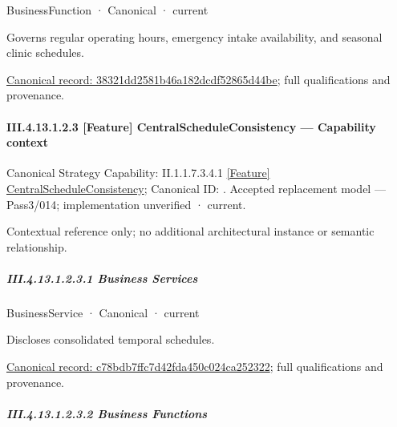 \label{element:38321dd2581b46a182dcdf52865d44be}
{\small BusinessFunction · Canonical · current}\par

Governs regular operating hours, emergency intake availability, and seasonal clinic schedules.


{\footnotesize \href{../../../../../../../continuum/business/business-function/38321dd2581b46a182dcdf52865d44be.md}{Canonical record: 38321dd2581b46a182dcdf52865d44be}; full qualifications and provenance.}\par
\paragraph*{III.4.13.1.2.3 [Feature] CentralScheduleConsistency — Capability context}
\label{navigation:III.4.13.1.2.3}

{\small Canonical Strategy Capability: II.1.1.7.3.4.1 \hyperref[element:5a39c3923f0e4e079acf913126754075]{[Feature] CentralScheduleConsistency}; Canonical ID: \texttt{}. Accepted replacement model — Pass3/014; implementation unverified · current.}\par
Contextual reference only; no additional architectural instance or semantic relationship.\par
\subparagraph*{III.4.13.1.2.3.1 Business Services}
\label{navigation:III.4.13.1.2.3.1}

\label{navigation:III.4.13.1.2.3.1.1}

\label{element:c78bdb7ffc7d42fda450c024ca252322}
{\small BusinessService · Canonical · current}\par

Discloses consolidated temporal schedules.


{\footnotesize \href{../../../../../../../continuum/business/business-service/c78bdb7ffc7d42fda450c024ca252322.md}{Canonical record: c78bdb7ffc7d42fda450c024ca252322}; full qualifications and provenance.}\par
\subparagraph*{III.4.13.1.2.3.2 Business Functions}
\label{navigation:III.4.13.1.2.3.2}

